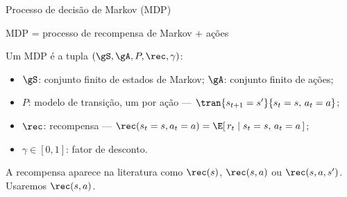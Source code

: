 \documentclass[aspectratio=169, 11pt]{beamer}
\begin{document}
\begin{frame}{Processo de decisão de Markov (MDP)}
  \begin{center}
    {\large MDP \;=\; processo de recompensa de Markov \;\alert{$+$ ações}}
  \end{center}
  \begin{defbox}{}
    Um MDP é a tupla $(\gS, \gA, P, \rec, \gamma)$:
    \begin{itemize}\setlength{\itemsep}{0.1ex}
      \item $\gS$: conjunto finito de estados de Markov; \quad $\gA$: conjunto finito de ações;
      \item $P$: modelo de transição, um por ação --- $\tran{s_{t+1}=s'}{s_t=s,\, a_t=a}$;
      \item $\rec$: recompensa --- $\rec(s_t=s, a_t=a) = \E[\, r_t \mid s_t=s,\, a_t=a \,]$;
      \item $\gamma \in [0,1]$: fator de desconto.
    \end{itemize}
  \end{defbox}
  \begin{alertabox}
    A recompensa aparece na literatura como $\rec(s)$, $\rec(s,a)$ ou $\rec(s,a,s')$.
    Usaremos \alert{$\rec(s,a)$}. 
  \end{alertabox}
\end{frame}
\end{document}
